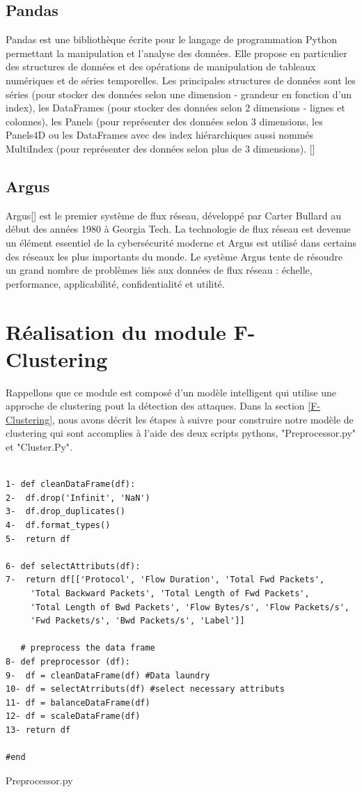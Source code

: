 \subsection{Pandas}
Pandas est une bibliothèque écrite pour le langage de programmation Python permettant la manipulation et l'analyse des données. Elle propose en particulier des structures de données et des opérations de manipulation de tableaux numériques et de séries temporelles. Les principales structures de données sont les séries (pour stocker des données selon une dimension - grandeur en fonction d'un index), les DataFrames (pour stocker des données selon 2 dimensions - lignes et colonnes), les Panels (pour représenter des données selon 3 dimensions, les Panels4D ou les DataFrames avec des index hiérarchiques aussi nommés MultiIndex (pour représenter des données selon plus de 3 dimensions). [\cite{30}]

\subsection{Argus}
Argus[\cite{31}] est le premier système de flux réseau, développé par Carter Bullard au début des années 1980 à Georgia Tech. La technologie de flux réseau est devenue un élément essentiel de la cybersécurité moderne et Argus est utilisé dans certains des réseaux les plus importants du monde. Le système Argus tente de résoudre un grand nombre de problèmes liés aux données de flux réseau : échelle, performance, applicabilité, confidentialité et utilité.\\

\section{Réalisation du module F-Clustering}
Rappellons que ce module est composé d'un modèle intelligent qui utilise une approche de clustering pout la détection des attaques. Dans la section \ref{F-Clustering}, nous avons décrit les étapes à suivre pour construire notre modèle de clustering qui sont accomplies à l'aide des deux scripts pythons, "Preprocessor.py" et "Cluster.Py".
\begin{algorithm}[H]
\begin{verbatim}

1- def cleanDataFrame(df):
2-  df.drop('Infinit', 'NaN')
3-  df.drop_duplicates()
4-  df.format_types()
5-  return df

6- def selectAttributs(df):
7-  return df[['Protocol', 'Flow Duration', 'Total Fwd Packets',
     'Total Backward Packets', 'Total Length of Fwd Packets',	
     'Total Length of Bwd Packets', 'Flow Bytes/s', 'Flow Packets/s', 
     'Fwd Packets/s', 'Bwd Packets/s', 'Label']]
	
   # preprocess the data frame
8- def preprocessor (df): 
9-  df = cleanDataFrame(df) #Data laundry
10- df = selectAtrributs(df) #select necessary attributs 
11- df = balanceDataFrame(df) 
12- df = scaleDataFrame(df)
13- return df

#end
\end{verbatim}
\caption{Preprocessor.py}
\end{algorithm}

